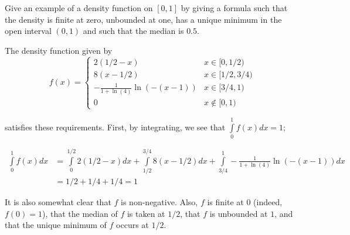 \begin{problem}[Handout 12, \# 17]
  Give an example of a density function on \([0,1]\) by giving a formula
  such that the density is finite at zero, unbounded at one, has a unique
  minimum in the open interval \((0,1)\) and such that the median is
  \(0.5\).
\end{problem}
\begin{solution}
The density function given by
\[
f(x) =

\begin{cases}
      2(1/2-x) & x \in [0,1/2) \\
      8(x-1/2) & x \in [1/2,3/4) \\
      -\frac{1}{1+\ln(4)}\ln(-(x-1)) & x \in [3/4,1) \\
      0 & x \notin [0,1)
   \end{cases}
\]

satisfies these requirements. First, by integrating, we see that $\int\limits_0^1 f(x)dx = 1$;

\begin{align*}
\int\limits_0^1 f(x) dx &= \int\limits_0^{1/2} 2(1/2-x) dx + \int\limits_{1/2}^{3/4} 8(x-1/2) dx + \int\limits_{3/4}^1 -\frac{1}{1+\ln(4)}\ln(-(x-1)) dx \\
&= 1/2 + 1/4 + 1/4 = 1
\end{align*}

It is also somewhat clear that $f$ is non-negative. Also, $f$ is finite at $0$ (indeed, $f(0) = 1$), that the median of $f$ is taken at $1/2$, that $f$ is unbounded at $1$, and that the unique minimum of $f$ occurs at $1/2$.

\end{solution}
\newpage

